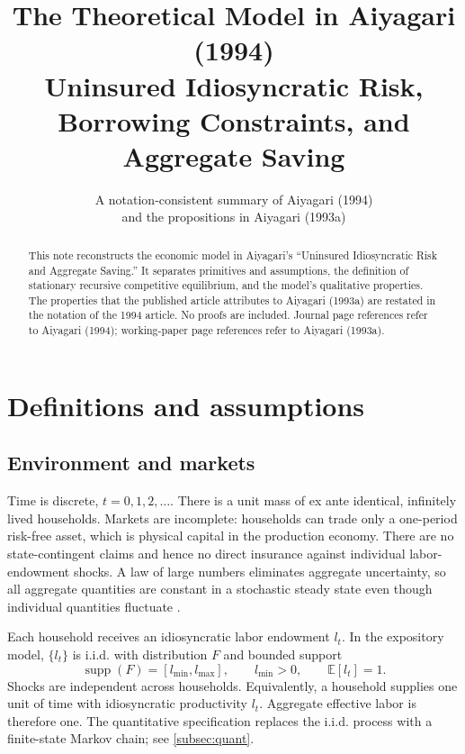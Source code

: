 \documentclass[11pt]{article}
\title{\textbf{The Theoretical Model in Aiyagari (1994)}\\[0.4em]
\large Uninsured Idiosyncratic Risk, Borrowing Constraints, and Aggregate Saving}
\author{A notation-consistent summary of Aiyagari (1994)\\
and the propositions in Aiyagari (1993a)}
\date{}
\theoremstyle{propertystyle}
\newcommand{\E}{\mathbb{E}}
\newcommand{\1}{\mathbf{1}}
\newcommand{\supp}{\operatorname{supp}}
\begin{document}
\maketitle

\begin{abstract}
This note reconstructs the economic model in Aiyagari's ``Uninsured
Idiosyncratic Risk and Aggregate Saving.''  It separates primitives and
assumptions, the definition of stationary recursive competitive equilibrium,
and the model's qualitative properties.  The properties that the published
article attributes to Aiyagari (1993a) are restated in the notation of the
1994 article.  No proofs are included.  Journal page references refer to
Aiyagari (1994); working-paper page references refer to Aiyagari (1993a).
\end{abstract}

\tableofcontents

\section{Definitions and assumptions}
\label{sec:definitions}

\subsection{Environment and markets}

Time is discrete, $t=0,1,2,\ldots$.  There is a unit mass of ex ante identical,
infinitely lived households.  Markets are incomplete: households can trade
only a one-period risk-free asset, which is physical capital in the production
economy.  There are no state-contingent claims and hence no direct insurance
against individual labor-endowment shocks.  A law of large numbers eliminates
aggregate uncertainty, so all aggregate quantities are constant in a
stochastic steady state even though individual quantities fluctuate
\cite[pp.~664--665]{aiyagari1994}.

Each household receives an idiosyncratic labor endowment $l_t$.  In the
expository model, $\{l_t\}$ is i.i.d. with distribution $F$ and bounded support
\[
  \supp(F)=[l_{\min},l_{\max}], \qquad l_{\min}>0, \qquad \E[l_t]=1.
\]
Shocks are independent across households.  Equivalently, a household supplies
one unit of time with idiosyncratic productivity $l_t$.  Aggregate effective
labor is therefore one.  The quantitative specification replaces the i.i.d.
process with a finite-state Markov chain; see \cref{subsec:quant}.
\end{document}
